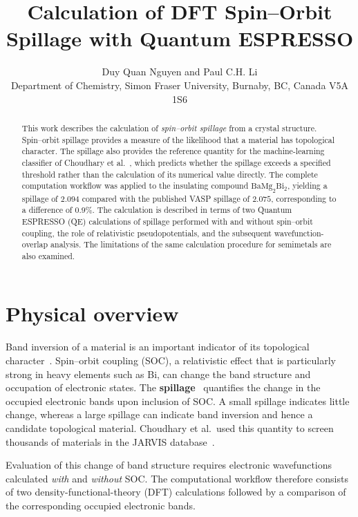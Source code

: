 \documentclass[11pt]{article}
\title{\textbf{Calculation of DFT Spin--Orbit Spillage with Quantum ESPRESSO}}
\author{Duy Quan Nguyen and Paul C.H. Li\\
\small Department of Chemistry, Simon Fraser University, Burnaby, BC, Canada V5A 1S6}
\date{}
\newcommand{\bmb}{\mathrm{BaMg_2Bi_2}}
\begin{document}
\maketitle

\begin{abstract}
\noindent This work describes the calculation of \emph{spin--orbit spillage} from a crystal
structure. Spin--orbit spillage provides a measure of the likelihood that a material has
topological character. The spillage also provides the reference quantity for the machine-learning classifier
of Choudhary et al.~\cite{choudhary2021}, which predicts whether the spillage exceeds a specified
threshold rather than the calculation of its numerical value directly.
The complete computation workflow was applied to the insulating compound $\bmb$, yielding a
spillage of $2.094$ compared with the published VASP spillage of $2.075$, corresponding to a
difference of $0.9\%$. The calculation is described in terms of two Quantum ESPRESSO (QE)
calculations of spillage performed with and without spin--orbit coupling, the role of relativistic
pseudopotentials, and the subsequent wavefunction-overlap analysis. The limitations of the same
calculation procedure for semimetals are also examined.
\end{abstract}

\section{Physical overview}

Band inversion of a material is an important indicator of its topological character~\cite{hasan2010}. Spin--orbit
coupling (SOC), a relativistic effect that is particularly strong in heavy elements such as Bi, can
change the band structure and occupation of electronic states. The \textbf{spillage}~\cite{liu2014}
quantifies the change in the occupied electronic bands upon inclusion of SOC. A small spillage
indicates little change, whereas a large spillage can indicate band inversion and hence a candidate
topological material. Choudhary et al.\ used this quantity to screen thousands of materials in the
JARVIS database~\cite{choudhary2019,choudhary2020npj}.

Evaluation of this change of band structure requires electronic wavefunctions calculated \emph{with}
and \emph{without} SOC. The computational workflow therefore consists of two density-functional-theory
(DFT) calculations followed by a comparison of the corresponding occupied electronic bands.
\end{document}
